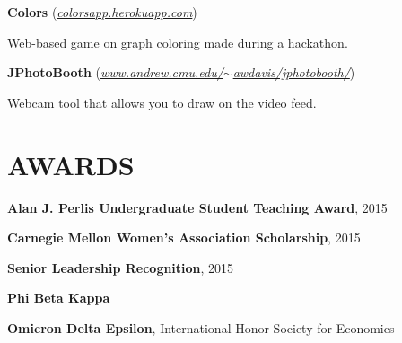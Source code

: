 \documentclass[margin, 11pt]{res} %
\begin{document}
\begin{resume}
\vspace{3pt}

{\bf Colors} {\small (\href{http://colorsapp.herokuapp.com}{\sl colorsapp.herokuapp.com})}
\begin{itemize} \itemsep -2pt
{\small \item Web-based game on graph coloring made during a hackathon.}
\end{itemize}



\vspace{3pt}
{\bf JPhotoBooth} {\small(\href{www.andrew.cmu.edu/~awdavis/jphotobooth/}{\sl www.andrew.cmu.edu/$\sim$awdavis/jphotobooth/})}
\begin{itemize} \itemsep -2pt
{\small \item Webcam tool that allows you to draw on the video feed.}
\end{itemize}



\section{AWARDS}

{\bf Alan J. Perlis Undergraduate Student Teaching Award}, 2015

\vspace{6pt}

{\bf Carnegie Mellon Women's Association Scholarship}, 2015

\vspace{6pt}

{\bf Senior Leadership Recognition}, 2015

\vspace{6pt}



{\bf Phi Beta Kappa}

\vspace{6pt}

{\bf Omicron Delta Epsilon}, International Honor Society for Economics


\end{resume}
\end{document}
